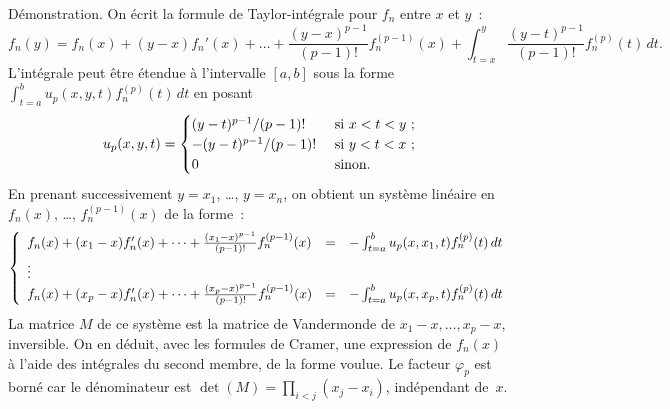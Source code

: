 {\begin{enumerate}
{    Démonstration. On écrit la formule de Taylor-intégrale pour $f_n$ entre
    $x$ et $y$~:
    $$f_n(y) = f_n(x) + (y-x)f_n'(x) + \dots + \frac{(y-x)^{p-1}}{(p-1)!}f_n^{(p-1)}(x)
             +  \int_{t=x}^y \frac{(y-t)^{p-1}}{(p-1)!}f_n^{(p)}(t)\,d t.$$
    L'intégrale peut être étendue à l'intervalle $[a,b]$ sous la forme
    $ \int_{t=a}^b u_p(x,y,t)f_n^{(p)}(t)\,d t$ en posant
    $$u_p(x,y,t) = \begin{cases}(y-t)^{p-1}/(p-1)!  & \text{ si } x < t < y~;\cr
                          -(y-t)^{p-1}/(p-1)! & \text{ si } y < t < x~;\cr
                          0                   & \text{ sinon}.\cr\end{cases}$$
    En prenant successivement $y=x_1$, \ldots, $y=x_n$, on obtient un
    système linéaire en $f_n(x)$, \dots, $f_n^{(p-1)}(x)$ de la forme~:
    $$\left\{\begin{array}{lll} f_n(x) + (x_1-x)f_n'(x) + \dots + \frac{(x_1-x)^{p-1}}{(p-1)!}f_n^{(p-1)}(x) &= &- \int_{t=a}^b u_p(x,x_1,t)f_n^{(p)}(t)\,d t\cr
             \noalign{\smallskip}\vdots\cr
             f_n(x) + (x_p-x)f_n'(x) + \dots + \frac{(x_p-x)^{p-1}}{(p-1)!}f_n^{(p-1)}(x) &= &- \int_{t=a}^b u_p(x,x_p,t)f_n^{(p)}(t)\,d t\cr\end{array}\right.$$
    La matrice $M$ de ce système est la matrice de Vandermonde de $x_1-x,\dots,x_p-x$,
    inversible. On en déduit, avec les
    formules de Cramer, une expression de $f_n(x)$ à l'aide des intégrales du second membre,
    de la forme voulue. Le facteur $\varphi_p$ est borné car le dénominateur
    est $\det(M) = \prod_{i<j}(x_j-x_i)$, indépendant de~$x$.}
\end{enumerate}
}